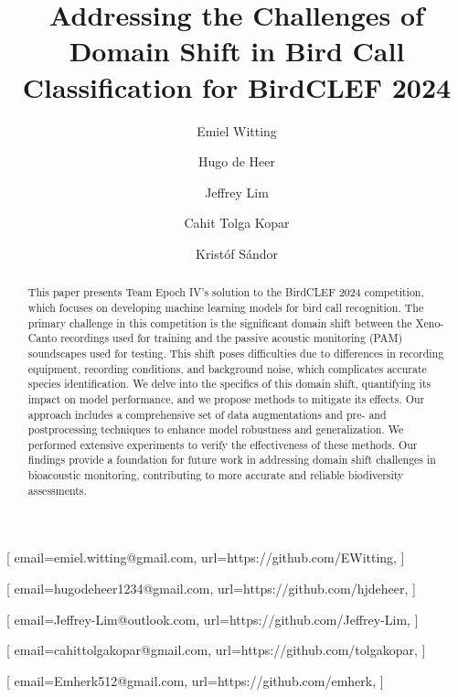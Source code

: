 \documentclass[
]{ceurart}
\begin{document}


\title{Addressing the Challenges of Domain Shift in Bird Call Classification for BirdCLEF 2024}

\address[1]{TU Delft Dream Team Epoch | Dream Hall, Stevinweg 4, 2628 CN Delft, The Netherlands}

\author[1]{Emiel Witting}[
email=emiel.witting@gmail.com,
url=https://github.com/EWitting,
]
\author[1]{Hugo de Heer}[
email=hugodeheer1234@gmail.com,
url=https://github.com/hjdeheer,
]

\author[1]{Jeffrey Lim}[
email=Jeffrey-Lim@outlook.com,
url=https://github.com/Jeffrey-Lim,
]

\author[1]{Cahit Tolga Kopar}[
email=cahittolgakopar@gmail.com,
url=https://github.com/tolgakopar,
]

\author[1]{Kristóf Sándor}[
email=Emherk512@gmail.com,
url=https://github.com/emherk,
]


\begin{abstract}
  This paper presents Team Epoch IV's solution to the BirdCLEF 2024 competition, which focuses on developing machine learning models for bird call recognition. The primary challenge in this competition is the significant domain shift between the Xeno-Canto recordings used for training and the passive acoustic monitoring (PAM) soundscapes used for testing. This shift poses difficulties due to differences in recording equipment, recording conditions, and background noise, which complicates accurate species identification. We delve into the specifics of this domain shift, quantifying its impact on model performance, and we propose methods to mitigate its effects. Our approach includes a comprehensive set of data augmentations and pre- and postprocessing techniques to enhance model robustness and generalization. We performed extensive experiments to verify the effectiveness of these methods. Our findings provide a foundation for future work in addressing domain shift challenges in bioacoustic monitoring, contributing to more accurate and reliable biodiversity assessments.
\end{abstract}
\end{document}
